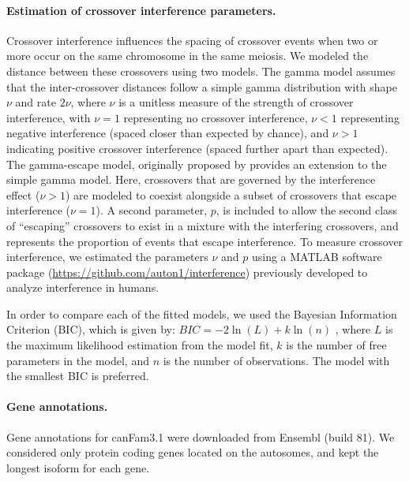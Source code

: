 \paragraph{Estimation of crossover interference parameters.}
Crossover interference influences the spacing of crossover events when two or more occur on the same chromosome in the same meiosis.
We modeled the distance between these crossovers using two models.
The gamma model\cite{Broman2000} assumes that the inter-crossover distances follow a simple gamma distribution with shape $\nu$ and rate $2\nu$, where $\nu$ is a unitless measure of the strength of crossover interference,
with $\nu=1$ representing no crossover interference, $\nu<1$ representing negative interference (spaced closer than expected by chance), and $\nu>1$ indicating positive crossover interference (spaced further apart than expected).
The gamma-escape model, originally proposed by \citet{Housworth2003} provides an extension to the simple gamma model.
Here, crossovers that are governed by the interference effect ($\nu>1$) are modeled to coexist alongside a subset of crossovers that escape interference ($\nu=1$).
A second parameter, $p$, is included to allow the second class of ``escaping'' crossovers to exist in a mixture with the interfering crossovers, and represents the proportion of events that escape interference.
To measure crossover interference, we estimated the parameters $\nu$ and $p$ using a MATLAB software package (\url{https://github.com/auton1/interference}) previously developed to analyze interference in humans\cite{Campbell2015}.

In order to compare each of the fitted models, we used the Bayesian Information Criterion (BIC), which is given by:
$BIC = -2 \ln( L ) + k \ln( n )$
, where $L$ is the maximum likelihood estimation from the model fit, $k$ is the number of free parameters in the model, and $n$ is the number of observations.
The model with the smallest BIC is preferred.

\paragraph{Gene annotations.}
Gene annotations for canFam3.1 were downloaded from Ensembl (build 81).
We considered only protein coding genes located on the autosomes, and kept the longest isoform for each gene.

